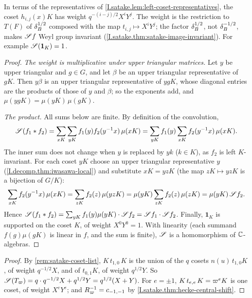 \noindent In terms of the representatives of \cref{I.satake.lem:left-coset-representatives}, the coset $h_{i,j}(x)K$
has weight $q^{-(i-j)/2}X^iY^j$. The weight is the restriction to $T(F)$ of $\delta_B^{1/2}$ composed with the map
$t_{i,j}\mapsto X^iY^j$; the factor $\delta_B^{1/2}$, not $\delta_B^{-1/2}$, makes $\mathscr{S} f$ Weyl group invariant
(\cref{I.satake.thm:satake-image-invariant}). For example $\mathscr{S}(\mathbf 1_K)=1$.

\begin{theorem}
\end{theorem}
\begin{proof}
\emph{The weight is multiplicative under upper triangular matrices.} Let $y$ be upper triangular and $g\in G$, and let
$\beta$ be an upper triangular representative of $gK$. Then $y\beta$ is an upper triangular representative of $ygK$,
whose diagonal entries are the products of those of $y$ and $\beta$; so the exponents add, and
$\mu(ygK)=\mu(yK)\,\mu(gK)$.

\emph{The product.} All sums below are finite. By definition of the convolution,
\[
  \mathscr{S}(f_1*f_2)=\sum_{xK}\sum_{yK}f_1(y)f_2(y^{-1}x)\,\mu(xK)=\sum_{yK}f_1(y)\sum_{xK}f_2(y^{-1}x)\,\mu(xK).
\]
The inner sum does not change when $y$ is replaced by $yk$ ($k\in K$), as $f_2$ is left $K$-invariant. For each coset
$yK$ choose an upper triangular representative $y$ (\cref{I.decomp.thm:iwasawa-local}) and substitute $xK=yzK$ (the map
$zK\mapsto yzK$ is a bijection of $G/K$):
\[
  \sum_{xK}f_2(y^{-1}x)\,\mu(xK)=\sum_{zK}f_2(z)\,\mu(yzK)=\mu(yK)\sum_{zK}f_2(z)\,\mu(zK)=\mu(yK)\,\mathscr{S} f_2 .
\]
Hence $\mathscr{S}(f_1*f_2)=\sum_{yK}f_1(y)\mu(yK)\cdot\mathscr{S} f_2=\mathscr{S} f_1\cdot\mathscr{S} f_2$. Finally, $\mathbf 1_K$ is
supported on the coset $K$, of weight $X^0Y^0=1$. With linearity
(each summand $f(g)\mu(gK)$ is linear in $f$, and the sum is finite), $\mathscr{S}$ is a homomorphism of $\mathbb{C}$-algebras.
\end{proof}

\begin{theorem}
\end{theorem}
\begin{proof}
By \cref{rem:satake-coset-list}, $K\,t_{1,0}\,K$ is the union of the $q$ cosets $n(u)\,t_{1,0}K$, of weight
$q^{-1/2}X$, and of $t_{0,1}K$, of weight $q^{1/2}Y$. So $\mathscr{S}(T_\varpi)=q\cdot q^{-1/2}X+q^{1/2}Y=q^{1/2}(X+Y)$.
For $e=\pm1$, $K\,t_{e,e}\,K=\varpi^eK$ is one coset, of weight $X^eY^e$; and $R_\varpi^{-1}=c_{-1,-1}$ by
\cref{I.satake.thm:hecke-central-shift}.
\end{proof}

